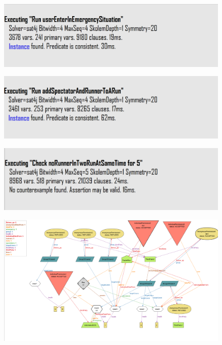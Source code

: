 \documentclass[a4paper]{article}
\begin{document}
\begin{figure}[H]
    \centering
    \includegraphics[width=\textwidth]{alloyResult3}
\end{figure}

\begin{figure}[H]
    \centering
    \includegraphics[width=\textwidth]{alloyResult4}
\end{figure}

\begin{figure}[H]
    \centering
    \includegraphics[width=\textwidth]{alloyResult5}
\end{figure}

\clearpage

\begin{figure}
    \centering
    \includegraphics[width=\textwidth]{worldAlloy}
\end{figure}
\end{document}
